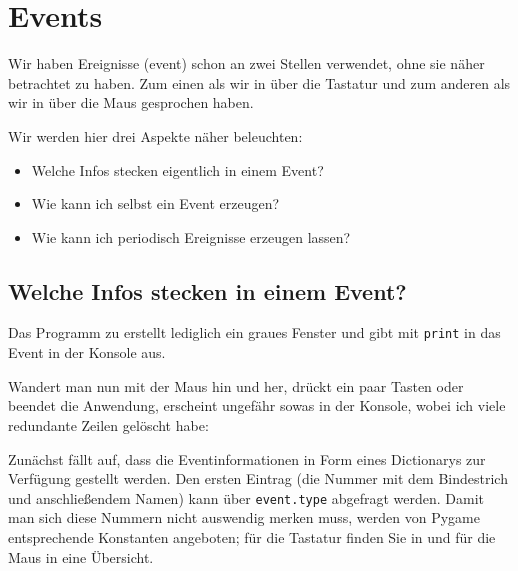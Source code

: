 \newpage
\section{Events}\label{secEvents}
Wir haben Ereignisse (\gls{event}) schon an zwei Stellen verwendet, ohne sie näher betrachtet zu haben. Zum einen als wir in  über die Tastatur und zum anderen als wir in  über die Maus gesprochen haben. 

Wir werden hier drei Aspekte näher beleuchten: 

\begin{itemize}
    \item Welche Infos stecken eigentlich in einem Event?
    \item Wie kann ich selbst ein Event erzeugen?
    \item Wie kann ich periodisch Ereignisse erzeugen lassen?
\end{itemize}


\subsection{Welche Infos stecken in einem Event?}

Das Programm zu  erstellt lediglich ein graues Fenster und gibt mit \texttt{print} in  das Event in der Konsole aus.


Wandert man nun mit der Maus hin und her, drückt ein paar Tasten oder beendet die Anwendung, erscheint ungefähr sowas in der Konsole, wobei ich viele redundante Zeilen gelöscht habe:


Zunächst fällt auf, dass die Eventinformationen in Form eines Dictionarys zur Verfügung gestellt werden. Den ersten Eintrag (die Nummer mit dem Bindestrich und anschließendem Namen) kann über \texttt{event.type} abgefragt werden. Damit man sich diese Nummern nicht auswendig merken muss, werden von Pygame entsprechende Konstanten angeboten; für die Tastatur finden Sie in  und für die Maus in  eine Übersicht.

